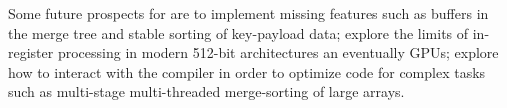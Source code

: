 \documentclass{juliacon}
\begin{document}
Some future prospects for \chipsort are to implement missing features such as buffers in the merge tree and stable sorting of key-payload data; explore the limits of in-register processing in modern 512-bit architectures an eventually GPUs; explore how to interact with the compiler in order to optimize code for complex tasks such as multi-stage multi-threaded merge-sorting of large arrays.





\end{document}
